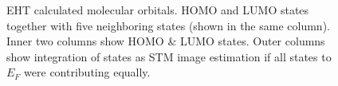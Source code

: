\begin{figure}[]
{			\label{fig:}
		}
		\caption{EHT calculated molecular orbitals. HOMO and LUMO states together with five neighboring states (shown in the same column). Inner two columns show HOMO \& LUMO states. Outer columns show integration of states as STM image estimation if all states to $E_F$ were contributing equally.}
		\label{fig:}
	\end{figure}
	\vfill
	\restoregeometry